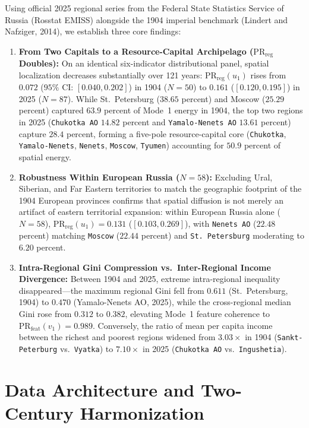 \documentclass[11pt,a4paper]{article}
\begin{document}
Using official 2025 regional series from the Federal State Statistics Service of Russia (Rosstat EMISS) alongside the 1904 imperial benchmark (Lindert and Nafziger, 2014), we establish three core findings:
\begin{enumerate}
    \item \textbf{From Two Capitals to a Resource-Capital Archipelago ($\mathrm{PR}_{\mathrm{reg}}$ Doubles):} On an identical six-indicator distributional panel, spatial localization decreases substantially over 121 years: $\mathrm{PR}_{\mathrm{reg}}(u_1)$ rises from $0.072$ ($95\%$ CI: $[0.040, 0.202]$) in 1904 ($N = 50$) to $0.161$ ($[0.120, 0.195]$) in 2025 ($N = 87$). While St.~Petersburg ($38.65$ percent) and Moscow ($25.29$ percent) captured $63.9$ percent of Mode~1 energy in 1904, the top two regions in 2025 (\texttt{Chukotka AO} $14.82$ percent and \texttt{Yamalo-Nenets AO} $13.61$ percent) capture $28.4$ percent, forming a five-pole resource-capital core (\texttt{Chukotka}, \texttt{Yamalo-Nenets}, \texttt{Nenets}, \texttt{Moscow}, \texttt{Tyumen}) accounting for $50.9$ percent of spatial energy.
    \item \textbf{Robustness Within European Russia ($N = 58$):} Excluding Ural, Siberian, and Far Eastern territories to match the geographic footprint of the 1904 European provinces confirms that spatial diffusion is not merely an artifact of eastern territorial expansion: within European Russia alone ($N = 58$), $\mathrm{PR}_{\mathrm{reg}}(u_1) = 0.131$ ($[0.103, 0.269]$), with \texttt{Nenets AO} ($22.48$ percent) matching \texttt{Moscow} ($22.44$ percent) and \texttt{St.~Petersburg} moderating to $6.20$ percent.
    \item \textbf{Intra-Regional Gini Compression vs.\ Inter-Regional Income Divergence:} Between 1904 and 2025, extreme intra-regional inequality disappeared—the maximum regional Gini fell from $0.611$ (St.~Petersburg, 1904) to $0.470$ (Yamalo-Nenets AO, 2025), while the cross-regional median Gini rose from $0.312$ to $0.382$, elevating Mode~1 feature coherence to $\mathrm{PR}_{\mathrm{feat}}(v_1) = 0.989$. Conversely, the ratio of mean per capita income between the richest and poorest regions widened from $3.03\times$ in 1904 (\texttt{Sankt-Peterburg} vs.\ \texttt{Vyatka}) to $7.10\times$ in 2025 (\texttt{Chukotka AO} vs.\ \texttt{Ingushetia}).
\end{enumerate}

\section{Data Architecture and Two-Century Harmonization}
\end{document}
